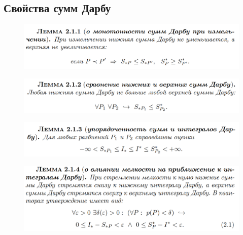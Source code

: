 \documentclass{article}
\begin{document}
\subsection{Свойства сумм Дарбу}
\begin{figure}[h!]
    \centering
    \includegraphics[width=\textwidth]{54.png}
    \vspace{-1cm}
\end{figure}
\begin{figure}[h!]
    \centering
    \includegraphics[width=\textwidth]{55.png}
    \vspace{-1cm}
\end{figure}
\begin{figure}[h!]
    \centering
    \includegraphics[width=\textwidth]{57.png}
    \vspace{-1cm}
\end{figure}
\begin{figure}[h!]
    \centering
    \includegraphics[width=\textwidth]{58.png}
    \vspace{-1cm}
\end{figure}
\newpage
\end{document}
